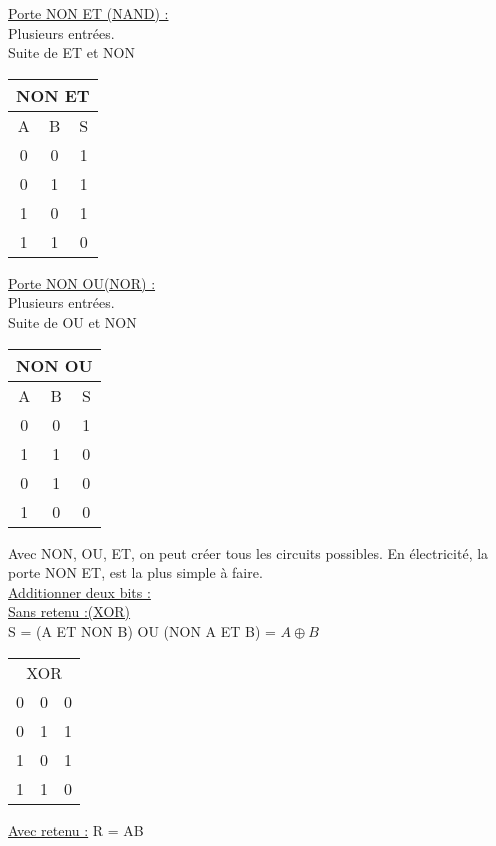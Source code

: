 \documentclass[../main.tex]{subfiles}
\begin{document}
\begin{minipage}{.5\textwidth}
    \quad \underline{Porte NON ET (NAND) :}\\
    Plusieurs entrées.\\
    Suite de ET et NON \\
    \centering
    \begin{tabular}{c|c|c}
        \multicolumn{3}{c}{NON ET}\\
        \hline
        A & B&S\\
        \hline
        0 & 0&1\\
        0&1&1\\
        1 & 0&1\\
        1&1&0\\
    \end{tabular}
\end{minipage}
\hfill
\begin{minipage}{.5\textwidth}
    \quad \underline{Porte NON OU(NOR) :}\\
    Plusieurs entrées.\\
    Suite de OU et NON \\
    \centering
    \begin{tabular}{c|c|c}
        \multicolumn{3}{c}{NON OU}\\
        \hline
        A & B&S\\
        \hline
        0 & 0&1\\
        1&1&0\\
        0&1&0\\
        1 & 0&0\\            
    \end{tabular}
\end{minipage}

Avec NON, OU, ET, on peut créer tous les circuits possibles. En électricité, la porte NON ET, est la plus simple à faire.\\
\quad \underline{Additionner deux bits :}\\
\underline{Sans retenu :(XOR)}\\
S = (A ET NON B) OU (NON A ET B) = $A\oplus B$\\

\begin{table}[hbt!]
    \centering
    \begin{tabular}{c|c|c}
        \multicolumn{3}{c}{XOR}\\
        0&0&0\\
        0 & 1&1\\
        1&0&1\\
        1&1&0\\
    \end{tabular}
    
\end{table}
\underline{Avec retenu :} R = AB\\
\end{document}
